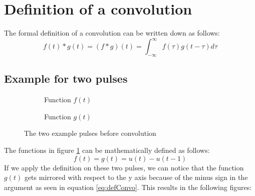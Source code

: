 \documentclass[]{subfiles}
\begin{document}
	\section{Definition of a convolution}
	The formal definition of a convolution can be written down as follows:
	\begin{equation*}
		\label{eq:defConvo}
		f(t)\ast g(t) = (f\ast g)(t) = \int_{-\infty}^{\infty} f(\tau) g(t-\tau) d\tau
	\end{equation*}
\subsection{Example for two pulses}
\begin{figure}[h]
	\centering
	\begin{subfigure}{.4\textwidth}
		\begin{center}
		\end{center}
	\caption{Function $f(t)$}
	\end{subfigure}%
	\begin{subfigure}{.4\textwidth}
		\begin{center}
		\end{center}
	\caption{Function $g(t)$}
	\end{subfigure}
\caption{The two example pulses before convolution}
\label{fig:convoVoorbeeld}
\end{figure}
The functions in figure \ref{fig:convoVoorbeeld} can be mathematically defined as follows:
\begin{equation*}
	f(t) = g(t) = u(t)-u(t-1)
\end{equation*}
If we apply the definition on these two pulses, we can notice that the function $g(t)$ gets mirrored with respect to the y axis because of the minus sign in the argument as seen in equation \ref{eq:defConvo}. This results in the following figures:  \\
\end{document}

